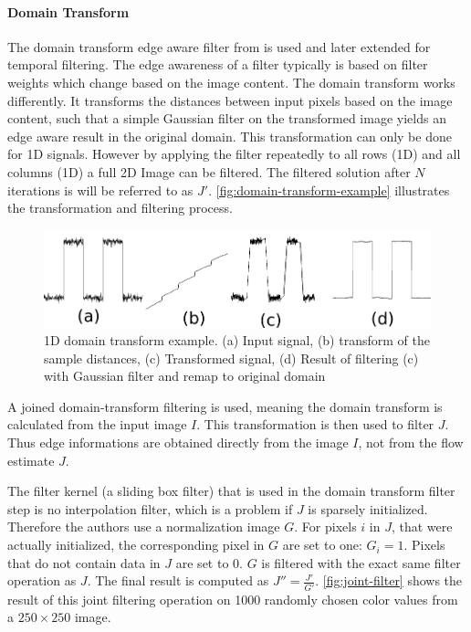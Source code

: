 \paragraph{Domain Transform} \label{domain-transform}
The domain transform edge aware filter from
\cite{GastalOliveira2011DomainTransform} is used and later extended for temporal
filtering. The edge awareness of a filter typically is based on filter weights
which change based on the image content. The domain transform works differently.
It transforms the distances between input pixels based on the image content,
such that a simple Gaussian filter on the transformed image yields an edge aware
result in the original domain. This transformation can only be done for 1D
signals.  However by applying the filter repeatedly to all rows (1D) and all
columns (1D) a full 2D Image can be filtered. The filtered solution after $N$
iterations is will be referred to as $J'$.
\autoref{fig:domain-transform-example} illustrates the transformation and
filtering process.

\begin{figure}[h!]
  \centering
  \includegraphics[width=.5\textwidth]{images/domain-transform.png}
  \caption{1D domain transform example. (a) Input signal, (b) transform
  of the sample distances, (c) Transformed signal, (d) Result of filtering (c) with
Gaussian filter and remap to original domain}
  \label{fig:domain-transform-example}
\end{figure}

A joined domain-transform filtering is used, meaning the domain transform is
calculated from the input image $I$. This transformation is then used to filter
$J$. Thus edge informations are obtained directly from the image $I$, not from
the flow estimate $J$.

The filter kernel (a sliding box filter) that is used in the domain transform
filter step is no interpolation filter, which is a problem if $J$ is sparsely
initialized.  Therefore the authors use a normalization image $G$. For pixels
$i$ in $J$, that were actually initialized, the corresponding pixel in $G$ are set
to one: $G_i = 1$.
Pixels that do not contain data in $J$ are set to 0. $G$ is filtered with the
exact same filter operation as $J$. The final result is computed as
$J''=\frac{J'}{G'}$.  \autoref{fig:joint-filter} shows the result of this joint
filtering operation on 1000 randomly chosen color values from a $250\times250$
image.

